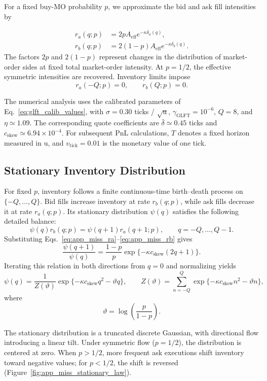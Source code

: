 \documentclass[11pt,a4paper]{article}
\begin{document}
For a fixed buy-MO probability $p$, we approximate
the bid and ask fill intensities by

\begin{align}
  r_a(q;p)
  &=
  2p A_{\mathrm{eff}}
  e^{-\kappa\delta_a(q)},
  \label{eq:app_miss_ra}\\
  r_b(q;p)
  &=
  2(1-p) A_{\mathrm{eff}}
  e^{-\kappa\delta_b(q)}.
  \label{eq:app_miss_rb}
\end{align}
The factors $2p$ and $2(1-p)$ represent changes
in the distribution of market-order sides at fixed
total market-order intensity. At $p=1/2$, the
effective symmetric intensities are recovered.
Inventory limits impose
\[
  r_a(-Q;p)=0,
  \qquad
  r_b(Q;p)=0.
\]

The numerical analysis uses the calibrated
parameters of Eq.~\eqref{eq:glft_calib_values},
with $\sigma=0.30$ ticks / $\sqrt{\mathrm{u}}$,
$\gamma_{\mathrm{GLFT}}=10^{-6}$, $Q=8$,
and $\eta\simeq1.09$.
The corresponding quote coefficients are
$\bar\delta\simeq0.45$ ticks and
$c_{\mathrm{skew}}\simeq6.94\times10^{-4}$.
For subsequent PnL calculations, $T$
denotes a fixed horizon measured in $\mathrm{u}$,
and $v_{\mathrm{tick}}=0.01$ is the monetary
value of one tick.


\subsection{Stationary Inventory Distribution}

For fixed $p$, inventory follows a finite continuous-time
birth--death process on $\{-Q,\ldots,Q\}$. Bid fills
increase inventory at rate $r_b(q;p)$, while ask fills
decrease it at rate $r_a(q;p)$. Its stationary
distribution $\psi(q)$ satisfies the following detailed balance:
\[
  \psi(q)r_b(q;p)
  =
  \psi(q+1)r_a(q+1;p),
  \qquad q=-Q,\ldots,Q-1.
\]
Substituting Eqs.~\eqref{eq:app_miss_ra}--\eqref{eq:app_miss_rb}
gives
\[
  \frac{\psi(q+1)}{\psi(q)}
  =
  \frac{1-p}{p}
  \exp\{-\kappa c_{\mathrm{skew}}(2q+1)\}.
\]
Iterating this relation in both directions from $q=0$
and normalizing yields
\begin{equation}
  \psi(q)
  =
  \frac{1}{Z(\vartheta)}
  \exp\{-\kappa c_{\mathrm{skew}}q^2-\vartheta q\},
  \qquad
  Z(\vartheta)
  =
  \sum_{n=-Q}^{Q}
  \exp\{-\kappa c_{\mathrm{skew}}n^2-\vartheta n\},
  \label{eq:app_miss_pi}
\end{equation}
where
\[
  \vartheta=\log\left(\frac{p}{1-p}\right).
\]

The stationary distribution is a truncated discrete
Gaussian, with directional flow introducing a linear
tilt. Under symmetric flow ($p=1/2$), the distribution
is centered at zero. When $p>1/2$, more frequent ask
executions shift inventory toward negative values;
for $p<1/2$, the shift is reversed
(Figure~\ref{fig:app_miss_stationary_law}).
\end{document}
